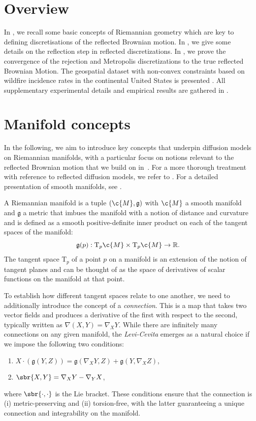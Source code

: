 
\section{Overview}
\label{sec:app_overview}
In , we recall some basic concepts of Riemannian geometry which are key to defining discretisations of the reflected Brownian motion.
In , we give some details on the reflection step in reflected discretizations.
In , we prove the convergence of the rejection and Metropolis discretizations to the true reflected Brownian Motion.
The geospatial dataset with non-convex constraints based on wildfire incidence rates in the continental United States is presented .
All supplementary experimental details and empirical results are gathered in .

\section{Manifold concepts}
\label{sec:riemannain_intro_dupref}

In the following, we aim to introduce key concepts that underpin diffusion models on Riemannian manifolds, with a particular focus on notions relevant to the reflected Brownian motion that we build on in~.
For a more thorough treatment with reference to reflected diffusion models, we refer to \cite{fishman2023diffusion}.
For a detailed presentation of smooth manifolds, see \textcite{lee2013smooth}.

A Riemannian manifold is a tuple $(\c{M}, \mathfrak{g})$ with $\c{M}$ a smooth manifold and $\mathfrak{g}$ a metric that imbues the manifold with a notion of distance and curvature and is defined as a smooth positive-definite inner product on each of the tangent spaces of the manifold: \[\mathfrak{g}(p): \mathrm{T}_p\c{M} \times \mathrm{T}_p\c{M} \to \R.
\]
The tangent space $\mathrm{T}_p$ of a point \(p\) on a manifold is an extension of the notion of tangent planes and can be thought of as the space of derivatives of scalar functions on the manifold at that point.

To establish how different tangent spaces relate to one another, we need to additionally introduce the concept of a \emph{connection}.
This is a map that takes two vector fields and produces a derivative of the first with respect to the second, typically written as \(\nabla(X, Y) = \nabla_X Y\).
While there are infinitely many connections on any given manifold, the \emph{Levi-Cevita} emerges as a natural choice if we impose the following two conditions: \begin{enumerate}[label=(\roman*)] \item \(X \cdot (\mathfrak{g}(Y,Z)) = \mathfrak{g}(\nabla_X Y, Z) + \mathfrak{g}(Y, \nabla_X Z)\), \item \(\sbr{X, Y} = \nabla_X Y - \nabla_Y X\), \end{enumerate} where \(\sbr{\cdot, \cdot}\) is the Lie bracket.
These conditions ensure that the connection is (i) metric-preserving and (ii) torsion-free, with the latter guaranteeing a unique connection and integrability on the manifold.

